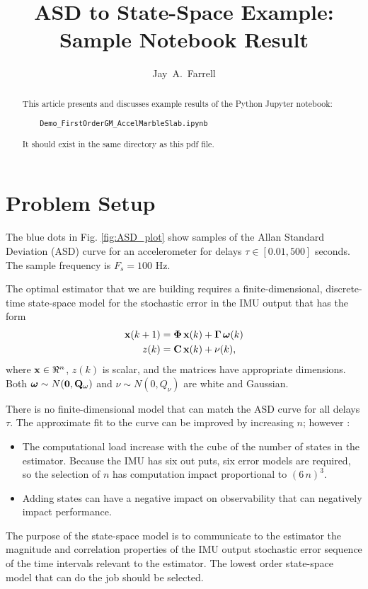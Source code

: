 \documentclass[letter,twocolumn]{article}
\begin{document}
	\title{ASD to State-Space Example: Sample Notebook Result}
\author{Jay~A.~Farrell}
\maketitle

\begin{abstract}
This article presents and discusses example results of the Python Jupyter notebook:
\begin{verbatim}
	Demo_FirstOrderGM_AccelMarbleSlab.ipynb
\end{verbatim}
It should exist in the same directory as this pdf file. 
\end{abstract}

\section{Problem Setup}
The blue dots in Fig. \ref{fig:ASD_plot} show samples of the Allan Standard Deviation (ASD) curve for an accelerometer for delays $\tau\in[0.01, 500]$ seconds. The sample frequency is $F_s = 100$ Hz.


The optimal estimator that we are building requires a finite-dimensional, discrete-time state-space model for the stochastic error in the IMU output that has the form
\begin{align}
	\mathbf{x}(k+1) &= \boldsymbol{\Phi}\, \mathbf{x}(k) + \boldsymbol{\Gamma} \, \boldsymbol{\omega}(k) \\
	z(k)   &= \mathbf{C} \,  \mathbf{x}(k) + \nu(k),
\end{align}
where $\mathbf{x}\in\Re^n$, $z(k)$ is scalar, and the matrices have appropriate dimensions. 
Both $\boldsymbol{\omega}\sim N(\boldsymbol{0},\mathbf{Q}_\omega)$ and $\nu\sim N(0,Q_\nu)$ are white and Gaussian. 

There is no finite-dimensional model that can match the ASD curve for all delays $\tau$.
The approximate fit to the curve can be improved by increasing $n$; however \cite{CSM_IMU}:
\begin{itemize}
	\item The computational load increase with the cube of the number of states in the estimator. Because the IMU has six out puts, six error models are required, so the selection of $n$ has computation impact proportional to $(6\, n)^3.$
	\item Adding states can have a negative impact on observability that can negatively impact performance.
\end{itemize} 
The purpose of the state-space model is to communicate to the estimator the magnitude and correlation properties 
of the IMU output stochastic error sequence of the time intervals relevant to the estimator. 
The lowest order state-space model that can do the job should be selected.
\end{document}
